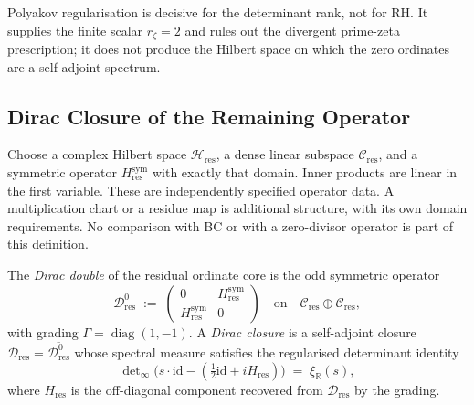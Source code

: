\begin{remark}
\label{v4-arith:w9-r4:rem:polyakov-no-rh}
Polyakov regularisation is decisive for the determinant rank,
not for RH. It supplies the finite scalar \(r_{\zeta}=2\) and
rules out the divergent prime-zeta prescription; it does not
produce the Hilbert space on which the zero ordinates are a
self-adjoint spectrum.
\end{remark}

\subsection{Dirac Closure of the Remaining Operator}
\label{v4-arith:w9-r4:pdnf:dirac}

\begin{definition}
\label{v4-arith:w9-r4:def:residual-ordinate-core}
Choose a complex Hilbert space \(\mathcal H_{\mathrm{res}}\), a dense
linear subspace \(\mathcal C_{\mathrm{res}}\), and a symmetric operator
\(H_{\mathrm{res}}^{\mathrm{sym}}\) with exactly that domain.
Inner products are linear in the first variable.
These are independently specified operator data. A multiplication
chart or a residue map is additional structure, with its own domain
requirements. No comparison with BC or with a zero-divisor operator
is part of this definition.
\end{definition}

\begin{definition}
\label{v4-arith:w9-r4:def:dirac-double}
\ClaimStatusDefinitional The \emph{Dirac double} of the residual
ordinate core is the odd symmetric operator
\begin{equation}
\label{v4-arith:w9-r4:eq:dirac-double}
\mathscr{D}_{\mathrm{res}}^{0}
\;:=\;
\begin{pmatrix}
0 & H_{\mathrm{res}}^{\mathrm{sym}}\\
H_{\mathrm{res}}^{\mathrm{sym}} & 0
\end{pmatrix}
\quad\text{on}\quad
\mathcal{C}_{\mathrm{res}}\oplus\mathcal{C}_{\mathrm{res}},
\end{equation}
with grading
\(\Gamma=\operatorname{diag}(1,-1)\). A \emph{Dirac closure} is a
self-adjoint closure
\(\mathscr{D}_{\mathrm{res}}=\overline{\mathscr{D}_{\mathrm{res}}^{0}}\)
whose spectral measure satisfies the regularised determinant
identity
\begin{equation}
\label{v4-arith:w9-r4:eq:dirac-det}
\det\nolimits_{\infty}\bigl(s\cdot\mathrm{id}
-({\tfrac12}\mathrm{id}+iH_{\mathrm{res}})\bigr)
\;=\;\xi_{\mathbb{R}}(s),
\end{equation}
where \(H_{\mathrm{res}}\) is the off-diagonal component recovered
from \(\mathscr{D}_{\mathrm{res}}\) by the grading.
\end{definition}

